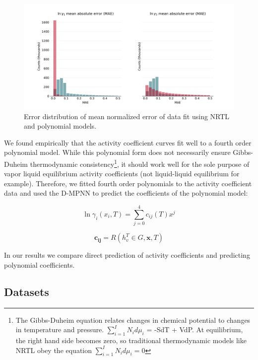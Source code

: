\begin{figure}
    \centering
    \includegraphics[width=\textwidth]{gfx/Chapter07/error_distribution_fitting_cosmo.png}
    \caption{Error distribution of mean normalized error of data fit using NRTL and polynomial models.}
    \label{fig:mnae_distribution}
\end{figure}

We found empirically that the activity coefficient curves fit well to a fourth order polynomial model. While this  polynomial form does not necessarily ensure Gibbs-Duheim thermodynamic consistency\footnote{The Gibbs-Duheim equation relates changes in chemical potential to changes in temperature and pressure. $\sum_{i=1}^I N_i d\mu_i$ = -SdT + VdP. At equilibrium, the right hand side becomes zero, so traditional thermodynamic models like NRTL obey the equation $\sum_{i=1}^I N_i d\mu_i=0$}, it should work well for the sole purpose of vapor liquid equilibrium activity coefficients (not liquid-liquid equilibrium for example). Therefore, we fitted fourth order polynomials to the activity coefficient data and used the D-MPNN to predict the coefficients of the polynomial model:

\begin{equation}
    \ln \gamma_i(x_i,T) = \sum_{j=0}^4 c_{ij}(T)x^j
\end{equation}

\begin{equation}
     \mathbf{c_{ij}} = R(h_v^T \in G, \mathbf{x}, T)
\end{equation}

In our results we compare direct prediction of activity coefficients and predicting polynomial coefficients.

\subsection{Datasets}

